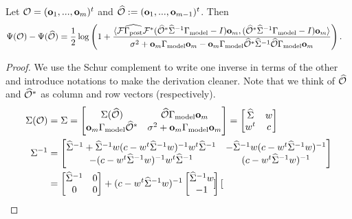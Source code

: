 \documentclass{amsart}
\numberwithin{equation}{section}
\begin{document}
\begin{lemma}\label{lemma:design increase}
  Let $\mathcal{O} = (\mathbf{o}_1,...,\mathbf{o}_m)^t$ and $\widehat{\mathcal{O}} := (\mathbf{o}_1,...,\mathbf{o}_{m-1})^t$. Then
  \begin{align*}
    \Psi( \mathcal{O} ) - \Psi (\widehat{\mathcal{O}} ) &=
    \frac12 \log \left ( 1 + \frac{
      \langle \mathcal{F} \widehat{\Gamma_{\textup{post}}} \mathcal{F}^* (\widehat{\mathcal{O}}^* \widehat{\Sigma}^{-1} \Gamma_{\textup{model}} - I ) \mathbf{o}_m,
      (\widehat{\mathcal{O}}^* \widehat{\Sigma}^{-1} \Gamma_{\textup{model}} - I ) \mathbf{o}_m \rangle
    }{
      \sigma^2 + \mathbf{o}_m \Gamma_{\textup{model}} \mathbf{o}_m - \mathbf{o}_m \Gamma_{\textup{model}} \widehat{\mathcal{O}}^* \widehat{\Sigma}^{-1} \widehat{\mathcal{O}} \Gamma_{\textup{model}} \mathbf{o}_m 
    }       
    \right ).
  \end{align*}
\end{lemma}
\begin{proof}
  We use the Schur complement to write one inverse in terms of the other and
  introduce notations to make the derivation cleaner. Note that we think of
  $\widehat{\mathcal{O}}$ and $\widehat{\mathcal{O}}^*$ as column and row vectors (respectively).
  \begin{align*}
    \Sigma( \mathcal{O} ) &= \Sigma = 
    \begin{bmatrix}
      \Sigma (\widehat{\mathcal{O}} )           & \widehat{\mathcal{O}} \Gamma_{\textup{model}} \mathbf{o}_m \\
      \mathbf{o}_m \Gamma_{\textup{model}} \widehat{\mathcal{O}}^*   & \sigma^2 + \mathbf{o}_m \Gamma_{\textup{model}} \mathbf{o}_m
    \end{bmatrix}
    =
    \begin{bmatrix}
      \widehat{\Sigma}   & w \\
      w^t       & c
    \end{bmatrix}\\
    \Sigma^{-1} &=
    \begin{bmatrix}
      \widehat{\Sigma}^{-1} + \widehat{\Sigma}^{-1} w ( c - w^t \widehat{\Sigma}^{-1} w)^{-1} w^t \widehat{\Sigma}^{-1} & - \widehat{\Sigma}^{-1} w ( c - w^t \widehat{\Sigma}^{-1} w)^{-1} \\
      -( c - w^t \widehat{\Sigma}^{-1} w)^{-1} w^t \widehat{\Sigma}^{-1}                            &  ( c - w^t \widehat{\Sigma}^{-1} w)^{-1}
    \end{bmatrix} \\
    &=
    \begin{bmatrix}
      \widehat{\Sigma}^{-1} & 0 \\
      0           & 0 
    \end{bmatrix}
    + (c -w^t \widehat{\Sigma}^{-1} w )^{-1}
    \begin{bmatrix}
      \widehat{\Sigma}^{-1} w \\
      -1
    \end{bmatrix}
    \begin{bmatrix}

\end{bmatrix}
\end{align*}
\end{proof}
\end{document}
